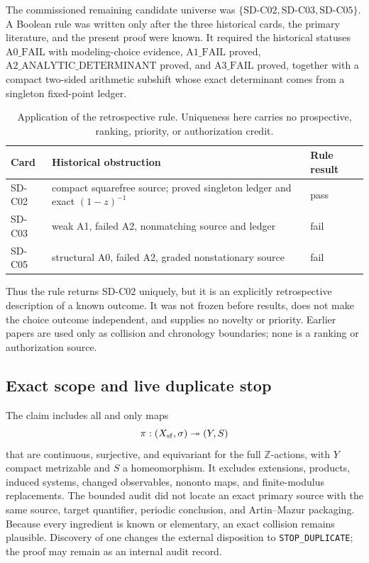 The commissioned remaining candidate universe was
\(\{\mathrm{SD\text{-}C02},\mathrm{SD\text{-}C03},
\mathrm{SD\text{-}C05}\}\).  A Boolean rule was written only after the three
historical cards, the primary literature, and the present proof were known.
It required the historical statuses
\(\mathrm{A0\_FAIL}\) with modeling-choice evidence,
\(\mathrm{A1\_FAIL}\) proved,
\(\mathrm{A2\_ANALYTIC\_DETERMINANT}\) proved, and
\(\mathrm{A3\_FAIL}\) proved, together with a compact two-sided arithmetic
subshift whose exact determinant comes from a singleton fixed-point ledger.

\begin{table}[t]
\centering
\small
\caption{Application of the retrospective rule.  Uniqueness here carries no
prospective, ranking, priority, or authorization credit.}
\label{tab:selector}
\begin{tabularx}{\textwidth}{@{}l>{\raggedright\arraybackslash}Xl@{}}
\toprule
Card & Historical obstruction & Rule result \\
\midrule
SD-C02 & compact squarefree source; proved singleton ledger and exact
  \((1-z)^{-1}\) & pass \\
SD-C03 & weak A1, failed A2, nonmatching source and ledger & fail \\
SD-C05 & structural A0, failed A2, graded nonstationary source & fail \\
\bottomrule
\end{tabularx}
\end{table}

Thus the rule returns SD-C02 uniquely, but it is an explicitly retrospective
description of a known outcome.  It was not frozen before results, does not
make the choice outcome independent, and supplies no novelty or priority.
Earlier papers are used only as collision and chronology boundaries; none is
a ranking or authorization source.

\subsection{Exact scope and live duplicate stop}

The claim includes all and only maps
\[
  \pi:(X_{\mathrm{sf}},\sigma)\twoheadrightarrow(Y,S)
\]
that are continuous, surjective, and equivariant for the full
\(\mathbb Z\)-actions, with \(Y\) compact metrizable and \(S\) a
homeomorphism.  It excludes extensions, products, induced systems, changed
observables, nononto maps, and finite-modulus replacements.  The bounded
audit did not locate an exact primary source with the same source, target
quantifier, periodic conclusion, and Artin--Mazur packaging.  Because every
ingredient is known or elementary, an exact collision remains plausible.
Discovery of one changes the external disposition to
\texttt{STOP\_DUPLICATE}; the proof may remain as an internal audit record.
